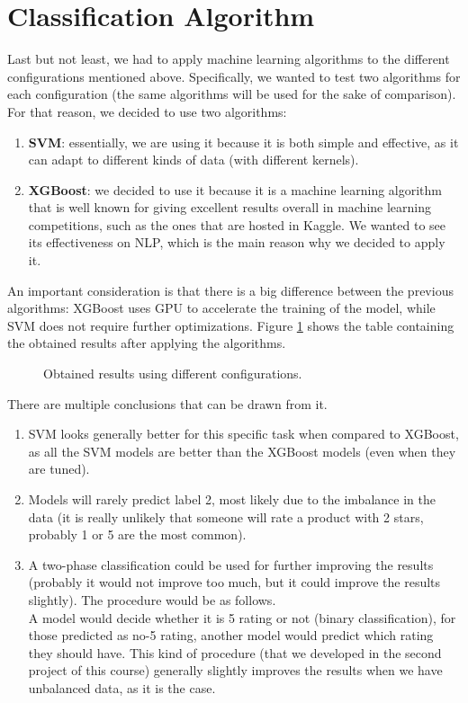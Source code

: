 \section{Classification Algorithm}
Last but not least, we had to apply machine learning algorithms to the different configurations mentioned above. Specifically, we wanted to test two algorithms for each configuration (the same algorithms will be used for the sake of comparison). For that reason, we decided to use two algorithms:

\begin{enumerate}
    \item \textbf{SVM}: essentially, we are using it because it is both simple and effective, as it can adapt to different kinds of data (with different kernels).
    \item \textbf{XGBoost}: we decided to use it because it is a machine learning algorithm that is well known for giving excellent results overall in machine learning competitions, such as the ones that are hosted in Kaggle. We wanted to see its effectiveness on NLP, which is the main reason why we decided to apply it.
\end{enumerate}

An important consideration is that there is a big difference between the previous algorithms: XGBoost uses GPU to accelerate the training of the model, while SVM does not require further optimizations. Figure \ref{Figure_ClassificationAlgorithms01} shows the table containing the obtained results after applying the algorithms.

\begin{figure}[h!]
	\centering
	\caption{Obtained results using different configurations.}
	\label{Figure_ClassificationAlgorithms01}
\end{figure}

\newpage

\noindent
There are multiple conclusions that can be drawn from it.

\begin{enumerate}
    \item SVM looks generally better for this specific task when compared to XGBoost, as all the SVM models are better than the XGBoost models (even when they are tuned).
    \item Models will rarely predict label 2, most likely due to the imbalance in the data (it is really unlikely that someone will rate a product with 2 stars, probably 1 or 5 are the most common).
    \item A two-phase classification could be used for further improving the results (probably it would not improve too much, but it could improve the results slightly). The procedure would be as follows.\\
    A model would decide whether it is 5 rating or not (binary classification), for those predicted as no-5 rating, another model would predict which rating they should have. This kind of procedure (that we developed in the second project of this course) generally slightly improves the results when we have unbalanced data, as it is the case.
\end{enumerate}

